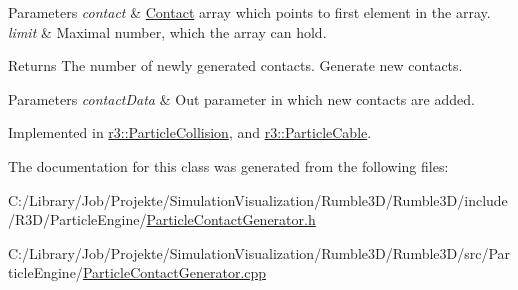 \begin{DoxyParams}{Parameters}
{\em contact} & \mbox{\hyperlink{classr3_1_1_contact}{Contact}} array which points to first element in the array. \\
\hline
{\em limit} & Maximal number, which the array can hold. \\
\hline
\end{DoxyParams}
\begin{DoxyReturn}{Returns}
The number of newly generated contacts. Generate new contacts. 
\end{DoxyReturn}

\begin{DoxyParams}{Parameters}
{\em contact\+Data} & Out parameter in which new contacts are added. \\
\hline
\end{DoxyParams}


Implemented in \mbox{\hyperlink{classr3_1_1_particle_collision_adb77c85cb90707073e7c654acb2e6719}{r3\+::\+Particle\+Collision}}, and \mbox{\hyperlink{classr3_1_1_particle_cable_a5187ee9d99fb41cf6e719c22c9b30a7c}{r3\+::\+Particle\+Cable}}.



The documentation for this class was generated from the following files\+:\begin{DoxyCompactItemize}
\item 
C\+:/\+Library/\+Job/\+Projekte/\+Simulation\+Visualization/\+Rumble3\+D/\+Rumble3\+D/include/\+R3\+D/\+Particle\+Engine/\mbox{\hyperlink{_particle_contact_generator_8h}{Particle\+Contact\+Generator.\+h}}\item 
C\+:/\+Library/\+Job/\+Projekte/\+Simulation\+Visualization/\+Rumble3\+D/\+Rumble3\+D/src/\+Particle\+Engine/\mbox{\hyperlink{_particle_contact_generator_8cpp}{Particle\+Contact\+Generator.\+cpp}}\end{DoxyCompactItemize}
